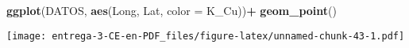 \documentclass[
]{article}
\newenvironment{Shaded}{\begin{snugshade}}{\end{snugshade}}
\newcommand{\DataTypeTok}[1]{\textcolor[rgb]{0.13,0.29,0.53}{#1}}
\newcommand{\DecValTok}[1]{\textcolor[rgb]{0.00,0.00,0.81}{#1}}
\newcommand{\KeywordTok}[1]{\textcolor[rgb]{0.13,0.29,0.53}{\textbf{#1}}}
\newcommand{\NormalTok}[1]{#1}
\newcommand{\OperatorTok}[1]{\textcolor[rgb]{0.81,0.36,0.00}{\textbf{#1}}}
\newcommand{\StringTok}[1]{\textcolor[rgb]{0.31,0.60,0.02}{#1}}
\begin{document}
\begin{Shaded}
\begin{Highlighting}[]
\KeywordTok{ggplot}\NormalTok{(DATOS, }\KeywordTok{aes}\NormalTok{(Long, Lat, }\DataTypeTok{color =}\NormalTok{ K_Cu))}\OperatorTok{+}
\StringTok{  }\KeywordTok{geom_point}\NormalTok{()}
\end{Highlighting}
\end{Shaded}

\texttt{[image: entrega-3-CE-en-PDF\_files/figure-latex/unnamed-chunk-43-1.pdf]}

\begin{Shaded}
\end{Shaded}
\end{document}

